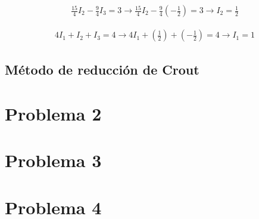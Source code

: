 \documentclass[a4paper, 12pt]{article}
\begin{document}
\begin{align*}
\frac{15}{4}I_2 - \frac{9}{4}I_3 = 3 
\rightarrow
\frac{15}{4}I_2 - \frac{9}{4}(-\frac{1}{2}) = 3
\rightarrow
I_2 = \frac{1}{2}
\end{align*}

\begin{align*}
4I_1 + I_2 + I_3 = 4 
\rightarrow
4I_1 + (\frac{1}{2}) + (-\frac{1}{2}) = 4
\rightarrow
I_1 = 1
\end{align*}

\subsection*{Método de reducción de Crout}

\section*{Problema 2}

\section*{Problema 3}

\section*{Problema 4}
\end{document}
